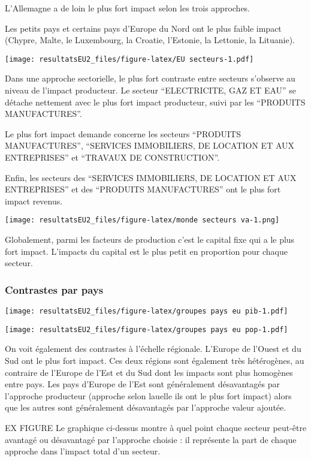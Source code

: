 \documentclass[
]{article}
\begin{document}
{{L'Allemagne a de loin le plus fort impact selon les trois approches.

Les petits pays et certains pays d'Europe du Nord ont le plus faible
impact (Chypre, Malte, le Luxembourg, la Croatie, l'Estonie, la
Lettonie, la Lituanie).

\texttt{[image: resultatsEU2\_files/figure-latex/EU secteurs-1.pdf]}

Dans une approche sectorielle, le plus fort contraste entre secteurs
s'observe au niveau de l'impact producteur. Le secteur ``ELECTRICITE,
GAZ ET EAU'' se détache nettement avec le plus fort impact producteur,
suivi par les ``PRODUITS MANUFACTURES''.

Le plus fort impact demande concerne les secteurs ``PRODUITS
MANUFACTURES'', ``SERVICES IMMOBILIERS, DE LOCATION ET AUX ENTREPRISES''
et ``TRAVAUX DE CONSTRUCTION''.

Enfin, les secteurs des ``SERVICES IMMOBILIERS, DE LOCATION ET AUX
ENTREPRISES'' et des ``PRODUITS MANUFACTURES'' ont le plus fort impact
revenus.

\texttt{[image: resultatsEU2\_files/figure-latex/monde secteurs va-1.png]}

Globalement, parmi les facteurs de production c'est le capital fixe qui
a le plus fort impact. L'impacts du capital est le plus petit en
proportion pour chaque secteur.

\hypertarget{contrastes-par-pays}{%
\subsubsection{Contrastes par pays}\label{contrastes-par-pays}}

\texttt{[image: resultatsEU2\_files/figure-latex/groupes pays eu pib-1.pdf]}

\texttt{[image: resultatsEU2\_files/figure-latex/groupes pays eu pop-1.pdf]}

On voit également des contrastes à l'échelle régionale. L'Europe de
l'Ouest et du Sud ont le plus fort impact. Ces deux régions sont
également très hétérogènes, au contraire de l'Europe de l'Est et du Sud
dont les impacts sont plus homogènes entre pays. Les pays d'Europe de
l'Est sont généralement désavantagés par l'approche producteur (approche
selon lauelle ils ont le plus fort impact) alors que les autres sont
généralement désavantagés par l'approche valeur ajoutée.

EX FIGURE Le graphique ci-dessus montre à quel point chaque secteur
peut-être avantagé ou désavantagé par l'approche choisie : il représente
la part de chaque approche dans l'impact total d'un secteur.

}}
\end{document}

